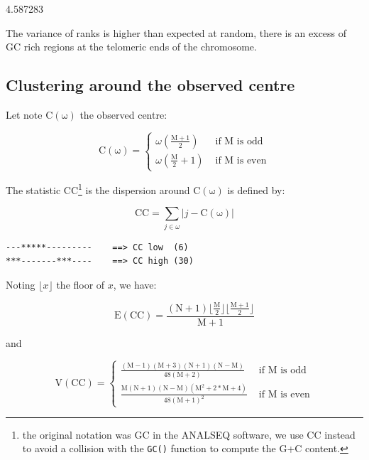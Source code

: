 \documentclass{article}
\begin{document}
\begin{Schunk}
\begin{Soutput}
[1] 4.587283
\end{Soutput}
\end{Schunk}

The variance of ranks is higher than expected at random, there is an excess of GC rich regions
at the telomeric ends of the chromosome.


\subsection{Clustering around the observed centre}

Let note $$ the observed centre:

$$
\mathrm{C(\omega)} = \left\{ \begin{array}{rl}
 \omega\left(\mathrm{\frac{M+1}{2}}\right) &\mbox{ if $\mathrm{M}$ is odd} \\
 \omega\left(\mathrm{\frac{M}{2} + 1}\right) &\mbox{ if $\mathrm{M}$ is even}
       \end{array} \right.
$$

The statistic $$\footnote{
the original notation was GC in the ANALSEQ software, we use CC instead to
avoid a collision with the \texttt{GC()} function to compute the G+C content.
} is the dispersion around $$ is defined by:

$$
\mathrm{CC} = \sum_{j \in \omega}{\left| j - \mathrm{C(\omega)} \right|}
$$

\begin{verbatim}
---*****---------    ==> CC low  (6)
***-------***----    ==> CC high (30)
\end{verbatim}

Noting $\lfloor x \rfloor$ the floor of $x$, we have:

$$
\mathrm{E(CC)} = \mathrm{\frac{(N+1)\lfloor\frac{M}{2}\rfloor\lfloor\frac{M+1}{2}\rfloor}{M+1}}
$$

and

$$
\mathrm{V(CC)} = \left\{ \begin{array}{rl}
 \mathrm{\frac{(M - 1)(M + 3)(N + 1)(N - M)}{48(M + 2)}} &\mbox{ if $\mathrm{M}$ is odd} \\
 \mathrm{\frac{M(N + 1)(N - M)(M^2 + 2*M + 4)}{48(M + 1)^2}} &\mbox{ if $\mathrm{M}$ is even}
       \end{array} \right.
$$
\end{document}
